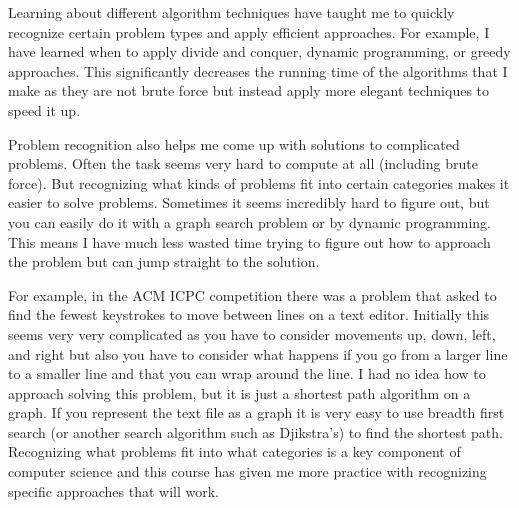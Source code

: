 \documentclass{article}
\begin{document}
Learning about different algorithm techniques have taught me to quickly recognize certain problem types and apply efficient approaches.
For example, I have learned when to apply divide and conquer, dynamic programming,
or greedy approaches. This significantly decreases the running time of the algorithms that I make as they are not brute force but instead apply more elegant techniques to speed it up.

Problem recognition also helps me come up with solutions to complicated problems.
Often the task seems very hard to compute at all (including brute force). But recognizing what kinds of problems fit into certain categories makes it easier to solve problems.
Sometimes it seems incredibly hard to figure out, but you can easily do it with a graph search problem or by dynamic programming.
This means I have much less wasted time trying to figure out how to approach the problem but can jump straight to the solution.

For example, in the ACM ICPC competition there was a problem that asked to find the fewest keystrokes to move between lines on a text editor.
Initially this seems very very complicated as you have to consider movements up,
down, left, and right but also you have to consider what happens if you go from a larger line to a smaller line and that you can wrap around the line.
I had no idea how to approach solving this problem, but it is just a shortest path algorithm on a graph.
If you represent the text file as a graph it is very easy to use breadth first search (or another search algorithm such as Djikstra's) to find the shortest path.
Recognizing what problems fit into what categories is a key component of computer science and this course has given me more practice with recognizing specific approaches that will work.
\end{document}
